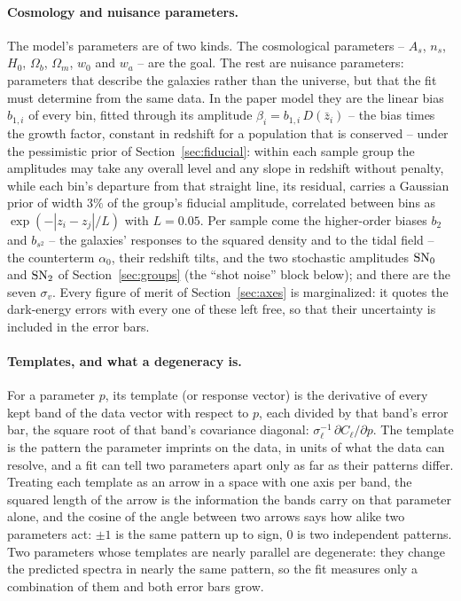 \documentclass[11pt]{article}
\newcommand{\sv}{\sigma_v}
\begin{document}
\paragraph{Cosmology and nuisance parameters.}
The model's parameters are of two kinds.  The cosmological
parameters -- $A_s$, $n_s$, $H_0$, $\Omega_b$, $\Omega_m$, $w_0$ and
$w_a$ -- are the goal.  The rest are nuisance parameters: parameters
that describe the galaxies rather than the universe, but that the
fit must determine from the same data.  In the paper model they are
the linear bias $b_{1,i}$ of every bin, fitted through its
amplitude $\beta_i = b_{1,i}\,D(\bar{z}_i)$ -- the bias times the
growth factor, constant in redshift for a population that is
conserved -- under the pessimistic prior of
Section~\ref{sec:fiducial}: within each sample group the amplitudes
may take any overall level and any slope in redshift without
penalty, while each bin's departure from that straight line, its
residual, carries a Gaussian prior of width $3\%$ of the group's
fiducial amplitude, correlated between bins as
$\exp(-|z_i - z_j|/L)$ with $L = 0.05$.  Per sample come the
higher-order biases $b_2$ and $b_{s^2}$ -- the galaxies' responses to
the squared density and to the tidal field -- the counterterm
$\alpha_0$,
their redshift tilts, and the two stochastic amplitudes ${\rm SN}_0$
and ${\rm SN}_2$ of Section~\ref{sec:groups} (the ``shot noise''
block below); and there are
the seven $\sv$.  Every figure of merit of Section~\ref{sec:axes} is
marginalized: it quotes the dark-energy errors with every one of
these left free, so that their uncertainty is included in the error
bars.

\paragraph{Templates, and what a degeneracy is.}
For a parameter $p$, its template (or response vector) is the
derivative of every kept band of the data vector with respect to
$p$, each divided by that band's error bar, the square root of that
band's covariance diagonal:
$\sigma_\ell^{-1}\,\partial C_\ell/\partial p$.  The template is the
pattern the parameter imprints on the data, in units of what the
data can resolve, and a fit can tell two parameters apart only as
far as their patterns differ.  Treating each template as an arrow in
a space with one axis per band, the squared length of the arrow is
the information the bands carry on that parameter alone, and the
cosine of the angle between two arrows says how alike two parameters
act: $\pm 1$ is the same pattern up to sign, $0$ is two independent
patterns.  Two parameters whose templates are nearly parallel are
degenerate: they change the predicted spectra in nearly the same
pattern, so the fit measures only a combination of them and both
error bars grow.
\end{document}

